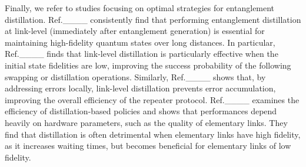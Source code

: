 Finally, we refer to studies focusing on optimal strategies for entanglement distillation.
% 
Ref.____ consistently find that performing entanglement distillation at link-level (immediately after entanglement generation) is essential for maintaining high-fidelity quantum states over long distances. In particular, Ref.____ finds that link-level distillation is particularly effective when the initial state fidelities are low, improving the success probability of the following swapping or distillation operations. Similarly, Ref.____ shows that, by addressing errors locally, link-level distillation prevents error accumulation, improving the overall efficiency of the repeater protocol.
% 
Ref.____ examines the efficiency of distillation-based policies and shows that performances depend heavily on hardware parameters, such as the quality of elementary links.
They find that distillation is often detrimental when elementary links have high fidelity, as it increases waiting times, but becomes beneficial for elementary links of low fidelity.

